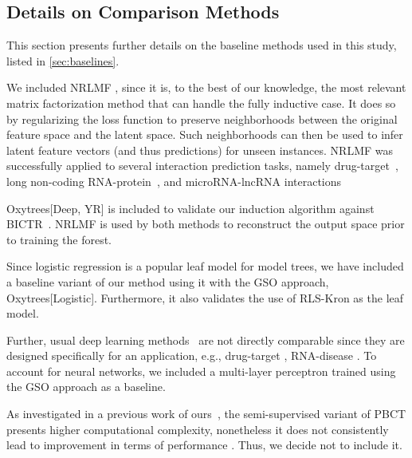 \begin{appendices}
\section{Details on Comparison Methods}
\label{sec:baselines details}

This section presents further details on the baseline methods used in this study, listed in \cref{sec:baselines}.

We included NRLMF \cite{liu_neighborhood_2016,liu_lpi-nrlmf_2017,liu_predicting_2020}, since it is, to the best of our knowledge, the most relevant matrix factorization method that can handle the fully inductive case.
It does so by regularizing the loss function to preserve neighborhoods between the original feature space and the latent space. Such neighborhoods can then be used to infer latent feature vectors (and thus predictions) for unseen instances.
NRLMF was successfully applied to several interaction prediction tasks, namely drug-target~\cite{liu_neighborhood_2016}, long non-coding RNA-protein~\cite{liu_lpi-nrlmf_2017}, and microRNA-lncRNA interactions~\cite{liu_predicting_2020}

Oxytrees[Deep, YR] is included to validate our induction algorithm against BICTR~\cite{pliakos_drug-target_2020}. NRLMF is used by both methods to reconstruct the output space prior to training the forest.

Since logistic regression is a popular leaf model for model trees, we have included a baseline variant of our method using it with the GSO approach, Oxytrees[Logistic]. Furthermore, it also validates the use of RLS-Kron as the leaf model.   

Further, usual deep learning methods~\cite{huang_moltrans_2020,dehghan_tripletmultidti_2023} are not directly comparable since they are designed specifically for an application, e.g., drug-target \cite{liu2024ssldti}, RNA-disease \cite{tian2024mgcnss}. To account for neural networks, we included a multi-layer perceptron trained using the GSO approach as a baseline. 

As investigated in a previous work of ours~\cite{ilidio_fast_2024}, the semi-supervised variant of PBCT presents higher computational complexity, nonetheless it does not consistently lead to improvement in terms of performance \cite{ilidio_fast_2024}. Thus, we decide not to include it.       


\end{appendices}
